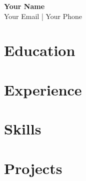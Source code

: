 \documentclass[a4paper,11pt]{article}
\begin{document}
  \begin{center}
      \textbf{\Large Your Name} \\
      Your Email | Your Phone
  \end{center}

  \section*{Education}
  \begin{itemize}[noitemsep]
  \end{itemize}

  \section*{Experience}
  \begin{itemize}[noitemsep]
  \end{itemize}

  \section*{Skills}
  \begin{itemize}[noitemsep]
  \end{itemize}

  \section*{Projects}
  \begin{itemize}[noitemsep]
  \end{itemize}

  
\end{document}
